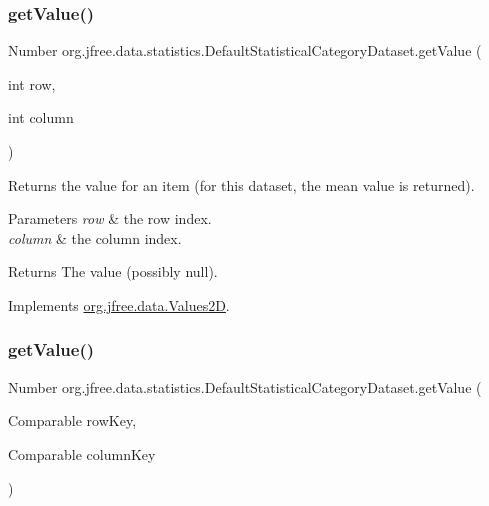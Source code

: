 \subsubsection{\texorpdfstring{get\+Value()}{getValue()}\hspace{0.1cm}{\footnotesize\ttfamily [1/2]}}
{\footnotesize\ttfamily Number org.\+jfree.\+data.\+statistics.\+Default\+Statistical\+Category\+Dataset.\+get\+Value (\begin{DoxyParamCaption}\item[{int}]{row,  }\item[{int}]{column }\end{DoxyParamCaption})}

Returns the value for an item (for this dataset, the mean value is returned).


\begin{DoxyParams}{Parameters}
{\em row} & the row index. \\
\hline
{\em column} & the column index.\\
\hline
\end{DoxyParams}
\begin{DoxyReturn}{Returns}
The value (possibly {\ttfamily null}). 
\end{DoxyReturn}


Implements \mbox{\hyperlink{interfaceorg_1_1jfree_1_1data_1_1_values2_d_a0797937d3ac62e18b300eef1fe906ec6}{org.\+jfree.\+data.\+Values2D}}.

\mbox{\label{classorg_1_1jfree_1_1data_1_1statistics_1_1_default_statistical_category_dataset_abd1e47cb280bcac4a251fcc160953f58}} 
\subsubsection{\texorpdfstring{get\+Value()}{getValue()}\hspace{0.1cm}{\footnotesize\ttfamily [2/2]}}
{\footnotesize\ttfamily Number org.\+jfree.\+data.\+statistics.\+Default\+Statistical\+Category\+Dataset.\+get\+Value (\begin{DoxyParamCaption}\item[{Comparable}]{row\+Key,  }\item[{Comparable}]{column\+Key }\end{DoxyParamCaption})}


